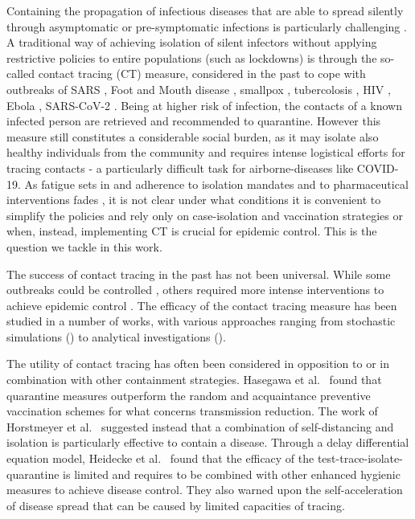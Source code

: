 \documentclass[aps,twocolumn,superscriptaddress,nofootinbib,pre,floatfix]{revtex4-1}
\begin{document}
Containing the propagation of infectious diseases that are able to
spread silently through asymptomatic or pre-symptomatic infections is
particularly challenging \cite{Fraser, Ferretti, Johansson, Li, Groendyke}.
A traditional way of achieving isolation of silent infectors without
applying restrictive policies to entire populations (such as lockdowns)
is through the so-called contact tracing (CT) measure, considered in the past to cope with outbreaks of SARS \cite{Riley2003, Lipsitch2003}, Foot and Mouth disease \cite{Ferguson2001}, smallpox \cite{Foege1971, Riley2006}, tubercolosis \cite{Fox2013}, HIV \cite{Rutherford1988}, Ebola \cite{Saurabh2017,Swanson2018}, SARS-CoV-2 \cite{Shin2020}.
Being at higher risk of infection, the contacts of a known infected
person are retrieved and recommended to
quarantine. However this measure still constitutes a considerable
social burden, as it may isolate also healthy individuals from the community and
requires intense logistical efforts for tracing contacts - a
particularly difficult task for airborne-diseases like COVID-19.
As fatigue sets in and adherence to isolation mandates and to
pharmaceutical interventions fades \cite{Silva2020}, it is not clear under what
conditions it is convenient to simplify the policies and rely only
on case-isolation and vaccination strategies or when, instead,
implementing CT is crucial for epidemic control.
This is the question we tackle in this work.

The success of contact tracing in the past has not been universal. While some outbreaks could be controlled \cite{Gibney2020}, others required more intense interventions to achieve epidemic control \cite{Blakely2020,Knapton2020}.
The efficacy of the contact tracing measure
has been studied in a number of works, with various approaches ranging
from stochastic simulations (\cite{Mancastroppa21, Kerr, Burdinski, Groendyke, Hellewelllancet, Hasegawa, Horstmeyer}) to analytical investigations
(\cite{Lee,Heidecke, House, ReynaLara, Bianconi, kojaku21, Burgio, Rizi}).

The utility of contact tracing has often been considered in opposition
to or in combination with other containment strategies.  Hasegawa et
al.~\cite{Hasegawa} found that quarantine measures outperform the
random and acquaintance preventive vaccination schemes for what
concerns transmission reduction.  The work of Horstmeyer et
al.~\cite{Horstmeyer} suggested instead that a combination of
self-distancing and isolation is particularly effective to contain a
disease.
Through a delay differential equation model,
Heidecke et al.~\cite{Heidecke} found that the efficacy of the
test-trace-isolate-quarantine is limited and requires to be combined
with other enhanced hygienic measures to achieve disease control. They also
warned upon the self-acceleration of disease spread that can be caused
by limited capacities of tracing.
\end{document}

